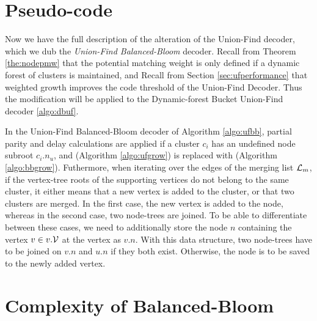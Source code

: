 

\section{Pseudo-code}
Now we have the full description of the alteration of the Union-Find decoder, which we dub the \emph{Union-Find Balanced-Bloom} decoder. Recall from Theorem \ref{the:nodepmw} that the potential matching weight is only defined if a dynamic forest of clusters is maintained, and Recall from Section \ref{sec:ufperformance} that weighted growth improves the code threshold of the Union-Find Decoder. Thus the modification will be applied to the Dynamic-forest Bucket Union-Find decoder \ref{algo:dbuf}. 

In the Union-Find Balanced-Bloom decoder of Algorithm \ref{algo:ufbb}, partial parity and delay calculations are applied if a cluster $c_i$ has an undefined node subroot $c_i.n_u$, and  (Algorithm \ref{algo:ufgrow}) is replaced with  (Algorithm \ref{algo:bbgrow}). Futhermore, when iterating over the edges of the merging list $\mathcal{L}_m$, if the vertex-tree roots of the supporting vertices do not belong to the same cluster, it either means that a new vertex is added to the cluster, or that two clusters are merged. In the first case, the new vertex is added to the node, whereas in the second case, two node-trees are joined. To be able to differentiate between these cases, we need to additionally store the node $n$ containing the vertex $v\in v.\mathcal{V}$ at the vertex as $v.n$. With this data structure, two node-trees have to be joined on $v.n$ and $u.n$ if they both exist. Otherwise, the node is to be saved to the newly added vertex. 



\section{Complexity of Balanced-Bloom}\label{sec:ufbbcomplexity}

